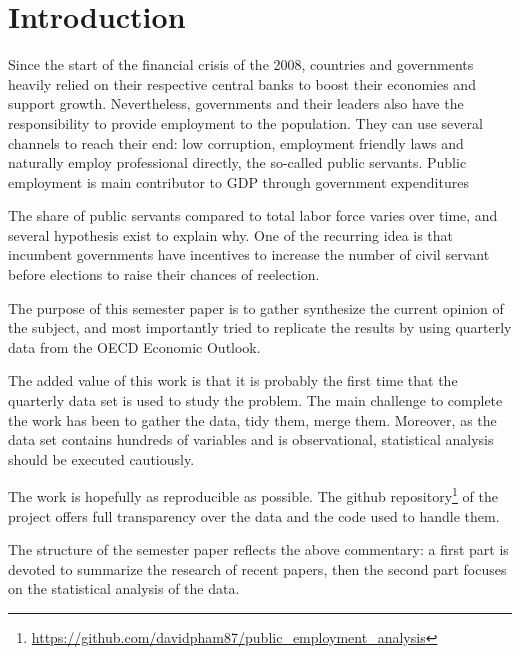 \chapter{Introduction}

Since the start of the financial crisis of the 2008, countries and governments
heavily relied on their respective central banks to boost their economies and
support growth. Nevertheless, governments and their leaders also have the
responsibility to provide employment to the population. They can use several
channels to reach their end: low corruption, employment friendly laws and
naturally employ professional directly, the so-called public servants. Public
employment is main contributor to GDP through government expenditures

The share of public servants compared to total labor force varies over time,
and several hypothesis exist to explain why. One of the recurring idea is that
incumbent governments have incentives to increase the number of civil servant
before elections to raise their chances of reelection.

The purpose of this semester paper is to gather synthesize the current opinion
of the subject, and most importantly tried to replicate the results by using
quarterly data from the OECD Economic Outlook.

The added value of this work is that it is probably the first time that the
quarterly data set is used to study the problem. The main challenge to complete
the work has been to gather the data, tidy them, merge them. Moreover,
as the data set contains hundreds of variables and is observational,
statistical analysis should be executed cautiously.

The work is hopefully as reproducible as possible. The github
repository\footnote{\url{https://github.com/davidpham87/public_employment_analysis}}
of the project offers full transparency over the data and the code used to
handle them.

The structure of the semester paper reflects the above commentary: a first part
is devoted to summarize the research of recent papers, then the second part
focuses on the statistical analysis of the data.

